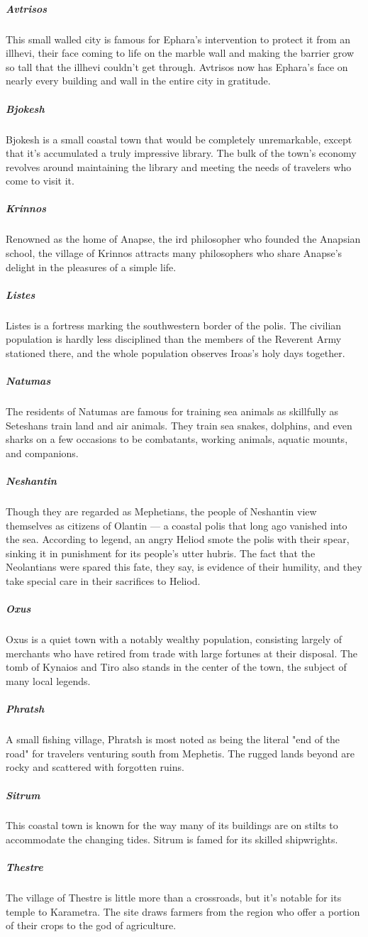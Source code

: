         \subparagraph{Avtrisos} This small walled city is famous for Ephara's intervention to protect it from an illhevi, their face coming to life on the marble wall and making the barrier grow so tall that the illhevi couldn't get through.
        Avtrisos now has Ephara's face on nearly every building and wall in the entire city in gratitude.

        \subparagraph{Bjokesh} Bjokesh is a small coastal town that would be completely unremarkable, except that it's accumulated a truly impressive library.
        The bulk of the town's economy revolves around maintaining the library and meeting the needs of travelers who come to visit it.

        \subparagraph{Krinnos} Renowned as the home of Anapse, the ird philosopher who founded the Anapsian school, the village of Krinnos attracts many philosophers who share Anapse's delight in the pleasures of a simple life.

        \subparagraph{Listes} Listes is a fortress marking the southwestern border of the polis.
        The civilian population is hardly less disciplined than the members of the Reverent Army stationed there, and the whole population observes Iroas's holy days together.

        \subparagraph{Natumas} The residents of Natumas are famous for training sea animals as skillfully as Seteshans train land and air animals.
        They train sea snakes, dolphins, and even sharks on a few occasions to be combatants, working animals, aquatic mounts, and companions.

        \subparagraph{Neshantin} Though they are regarded as Mephetians, the people of Neshantin view themselves as citizens of Olantin --- a coastal polis that long ago vanished into the sea.
        According to legend, an angry Heliod smote the polis with their spear, sinking it in punishment for its people's utter hubris.
        The fact that the Neolantians were spared this fate, they say, is evidence of their humility, and they take special care in their sacrifices to Heliod.

        \subparagraph{Oxus} Oxus is a quiet town with a notably wealthy population, consisting largely of merchants who have retired from trade with large fortunes at their disposal.
        The tomb of Kynaios and Tiro also stands in the center of the town, the subject of many local legends.

        \subparagraph{Phratsh} A small fishing village, Phratsh is most noted as being the literal "end of the road" for travelers venturing south from Mephetis.
        The rugged lands beyond are rocky and scattered with forgotten ruins.

        \subparagraph{Sitrum} This coastal town is known for the way many of its buildings are on stilts to accommodate the changing tides.
        Sitrum is famed for its skilled shipwrights.

        \subparagraph{Thestre} The village of Thestre is little more than a crossroads, but it's notable for its temple to Karametra.
        The site draws farmers from the region who offer a portion of their crops to the god of agriculture.

\newpage~\pagebreak %
